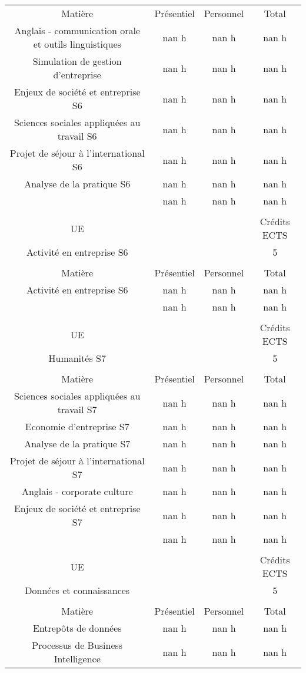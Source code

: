 \begin{longtable}{c c c c}
Matière&Présentiel&Personnel&Total\\%
Anglais {-} communication orale et outils linguistiques&nan h&nan h&nan h\\%
Simulation de gestion d'entreprise&nan h&nan h&nan h\\%
Enjeux de société et entreprise S6&nan h&nan h&nan h\\%
Sciences sociales appliquées au travail S6&nan h&nan h&nan h\\%
Projet de séjour à l'international S6&nan h&nan h&nan h\\%
Analyse de la pratique S6&nan h&nan h&nan h\\%
\hline%
&nan h&nan h&nan h\\%
\hline%
&&&\\%
UE&&&Crédits ECTS\\%
Activité en entreprise S6&&&5\\%
&&&\\%
Matière&Présentiel&Personnel&Total\\%
Activité en entreprise S6&nan h&nan h&nan h\\%
\hline%
&nan h&nan h&nan h\\%
\hline%
&&&\\%
UE&&&Crédits ECTS\\%
Humanités S7&&&5\\%
&&&\\%
Matière&Présentiel&Personnel&Total\\%
Sciences sociales appliquées au travail S7&nan h&nan h&nan h\\%
Economie d'entreprise S7&nan h&nan h&nan h\\%
Analyse de la pratique S7&nan h&nan h&nan h\\%
Projet de séjour à l'international S7&nan h&nan h&nan h\\%
Anglais {-} corporate culture &nan h&nan h&nan h\\%
Enjeux de société et entreprise S7&nan h&nan h&nan h\\%
\hline%
&nan h&nan h&nan h\\%
\hline%
&&&\\%
UE&&&Crédits ECTS\\%
Données et connaissances&&&5\\%
&&&\\%
Matière&Présentiel&Personnel&Total\\%
Entrepôts de données&nan h&nan h&nan h\\%
Processus de Business Intelligence&nan h&nan h&nan h\\%

\end{longtable}
